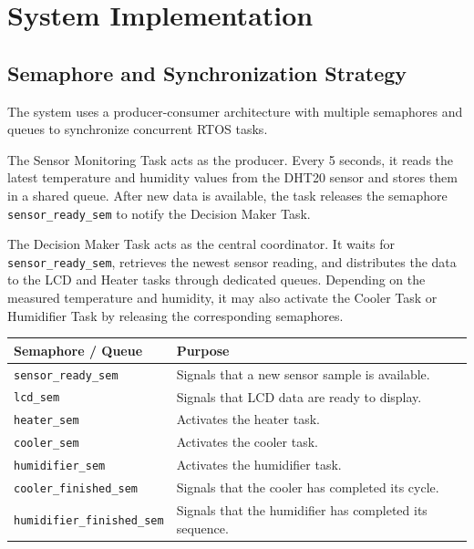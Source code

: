 \section{System Implementation}

\subsection{Semaphore and Synchronization Strategy}

The system uses a producer-consumer architecture with multiple semaphores and queues to synchronize concurrent RTOS
tasks.

The Sensor Monitoring Task acts as the producer. Every 5 seconds, it reads the latest temperature and humidity values
from the DHT20 sensor and stores them in a shared queue. After new data is available, the task releases the semaphore
\texttt{sensor\_ready\_sem} to notify the Decision Maker Task.

The Decision Maker Task acts as the central coordinator. It waits for \texttt{sensor\_ready\_sem}, retrieves the newest
sensor reading, and distributes the data to the LCD and Heater tasks through dedicated queues. Depending on the
measured temperature and humidity, it may also activate the Cooler Task or Humidifier Task by releasing the
corresponding semaphores.

\begin{center}
\renewcommand{\arraystretch}{1.25}

\begin{tabular}{|l|l|}
    \hline
    \rowcolor{RTOSBlue}
    \color{white}\bfseries\sffamily Semaphore / Queue &
    \color{white}\bfseries\sffamily Purpose \\
    \hline

    \texttt{sensor\_ready\_sem} &
    Signals that a new sensor sample is available. \\
    \hline

    \texttt{lcd\_sem} &
    Signals that LCD data are ready to display. \\
    \hline

    \texttt{heater\_sem} &
    Activates the heater task. \\
    \hline

    \texttt{cooler\_sem} &
    Activates the cooler task. \\
    \hline

    \texttt{humidifier\_sem} &
    Activates the humidifier task. \\
    \hline

    \texttt{cooler\_finished\_sem} &
    Signals that the cooler has completed its cycle. \\
    \hline

    \texttt{humidifier\_finished\_sem} &
    Signals that the humidifier has completed its sequence. \\
    \hline
\end{tabular}

\end{center}

